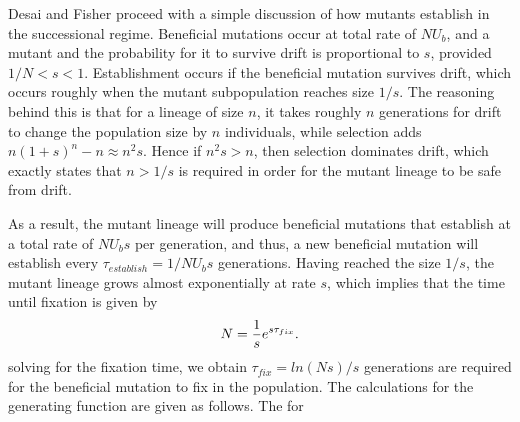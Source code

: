 \documentclass[12pt]{article}
\begin{document}
Desai and Fisher proceed with a simple discussion of how mutants establish in the successional regime.  Beneficial mutations occur at total rate of $NU_b$, and a mutant and the probability for it to survive drift is proportional to $s$, provided $1/N<s<1$.  Establishment occurs if the beneficial mutation survives drift, which occurs roughly when the mutant subpopulation reaches size $1/s$.  The reasoning behind this is that for a lineage of size $n$, it takes roughly $n$ generations for drift to change the population size by $n$ individuals, while selection adds $n(1+s)^n-n \approx n^2s$.  Hence if $n^2s>n$, then selection dominates drift, which exactly states that $n>1/s$ is required in order for the mutant lineage to be safe from drift. 

As a result, the mutant lineage will produce beneficial mutations that establish at a total rate of $NU_bs$ per generation, and thus, a new beneficial mutation will establish every $\tau_{establish} = 1/NU_bs$ generations.  Having reached the size $1/s$, the mutant lineage grows almost exponentially at rate $s$, which implies that the time until fixation is given by
\[
N={1 \over s}e^{s \tau_{fix}}.
\]
solving for the fixation time, we obtain $\tau_{fix}=ln(Ns)/s$ generations are required for the beneficial mutation to fix in the population.  
The calculations for the generating function are given as follows. The for


\end{document}
